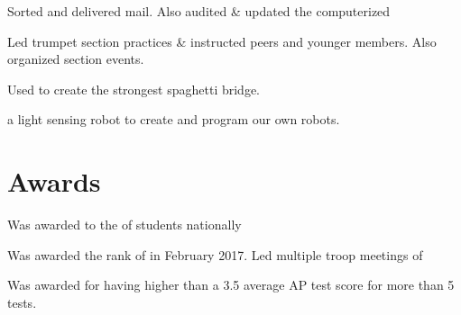 \documentclass{resume}
\begin{document}
\begin{tightemize}\item Sorted and delivered mail. Also audited \& updated the computerized  
\end{tightemize}
\sectionsep

\begin{tightemize}\item Led trumpet section practices \& instructed peers and younger members. Also organized section events. 
\end{tightemize}
\sectionsep

\begin{tightemize}
\item Used  to create the strongest spaghetti bridge.
\item {} a light sensing robot to create  and program our own robots.
\end{tightemize}
\sectionsep

\section{Awards}
\vspace{0.5mm}
\begin{tightemize}
\item[] Was awarded to the  of students nationally
\end{tightemize}
\sectionsep

\vspace{0.5mm}
\begin{tightemize}
\item[] Was awarded the rank of  in February 2017. Led multiple troop meetings of 
\end{tightemize}
\sectionsep

\vspace{0.5mm}
\begin{tightemize}
\item[] Was awarded for having higher than a 3.5 average AP test score for more than 5 tests.
\end{tightemize}
\sectionsep
\end{document}

